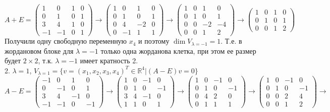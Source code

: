 \documentclass{article}
\begin{document}
$$A+E=\left(\begin{array}{rrrr}1 & 0 & 1 & 0\\0 & 1 & 0 & 1\\3 & 4 & 1 & 0\\-1 & -1 & 0 & 1\end{array}\right)\rightarrow\left(\begin{array}{rrrr}1 & 0 & 1 & 0\\0 & 1 & 0 & 1\\0 & 4 & -2 & 0\\0 & -1 & 1 & 1\end{array}\right)\rightarrow\left(\begin{array}{rrrr}1 & 0 & 1 & 0\\0 & 1 & 0 & 1\\0 & 0 & -2 & -4\\0 & 0 & 1 & 2\end{array}\right)\rightarrow\left(\begin{array}{rrrr}1 & 0 & 1 & 0\\0 & 1 & 0 & 1\\0 & 0 & 1 & 2\end{array}\right)$$
Получили одну свободную переменную $x_4$ и поэтому $\dim V_{\lambda=-1}=1$. Т.е. в жордановом блоке для $\lambda=-1$ только одна жорданова клетка, при этом ее размер будет $2\times2$, т.к. $\lambda=-1$ имеет кратность 2.
\\
2. $\lambda=1$, $V_{\lambda=1}=\{v=(x_1,x_2,x_3,x_4)^T\in\mathbb{R}^4|(A-E)v=0\}$
$$A-E=\left(\begin{array}{rrrr}-1 & 0 & 1 & 0\\0 & -1 & 0 & 1\\3 & 4 & -1 & 0\\-1 & -1 & 0 & -1\end{array}\right)\rightarrow\left(\begin{array}{rrrr}1 & 0 & -1 & 0\\0 & 1 & 0 & -1\\3 & 4 & -1 & 0\\1 & 1 & 0 & 1\end{array}\right)\rightarrow\left(\begin{array}{rrrr}1 & 0 & -1 & 0\\0 & 1 & 0 & -1\\0 & 4 & 2 & 0\\0 & 1 & 1 & 1\end{array}\right)\rightarrow\left(\begin{array}{rrrr}1 & 0 & -1 & 0\\0 & 1 & 0 & -1\\0 & 0 & 2 & 4\\0 & 0 & 1 & 2\end{array}\right)\rightarrow$$
\end{document}
